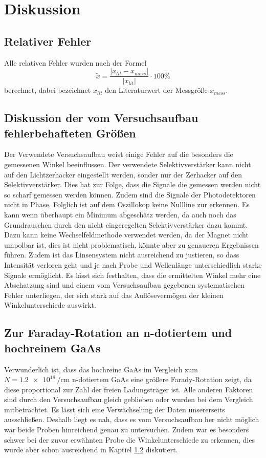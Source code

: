 \section{Diskussion}
\label{sec:Diskussion}
\subsection{Relativer Fehler}
Alle relativen Fehler wurden nach der Formel
\begin{equation*}
  \tilde{x} = \frac{ \lvert x_{lit} - x_{mess} \rvert}{\lvert x_{lit} \rvert}
  \cdot 100 \%
\end{equation*}
berechnet, dabei bezeichnet $x_{lit}$ den Literaturwert der Messgröße $x_{mess}$.

\subsection{Diskussion der vom Versuchsaufbau fehlerbehafteten Größen}
\label{sec:Fehler}
Der Verwendete Versuchsaufbau weist einige Fehler auf die besonders die gemessenen Winkel 
beeinflussen. Der verwendete Selektivverstärker kann nicht auf den Lichtzerhacker eingestellt 
werden, sonder nur der Zerhacker auf den Selektivverstärker. Dies hat zur Folge, dass die Signale 
die gemessen werden nicht so scharf gemessen werden können. Zudem sind die Signale der 
Photodetektoren nicht in Phase. Folglich ist auf dem Oszillokop keine Nullline zur erkennen. Es kann 
wenn überhaupt ein Minimum abgeschätz werden, da auch noch das Grundrauschen durch den nicht 
eingeregelten Selektivverstärker dazu kommt. Dazu kann keine Wechselfeldmethode verwendet werden, da 
der Magnet nicht umpolbar ist, dies ist nicht problematisch, könnte aber zu genaueren Ergebnissen 
führen. Zudem ist das Linsensystem nicht ausreichend zu justieren, so dass Intensität verloren geht 
und je nach Probe und Wellenlänge unterschiedlich starke Signale ermöglicht. 
Es lässt sich festhalten, dass die ermittelten Winkel mehr eine Abschatzung sind und einem vom 
Versuchsaufbau gegebenen systematischen Fehler unterliegen, der sich stark auf das Auflösevermögen 
der kleinen Winkelunterschiede auswirkt.

\subsection{Zur Faraday-Rotation an n-dotiertem und hochreinem GaAs}
Verwunderlich ist, dass das hochreine GaAs im Vergleich zum $N= \SI{1.2e18}{\per\centi\meter}$ 
n-dotiertem GaAs eine größere Farady-Rotation zeigt, da diese 
proportional zur Zahl der freien Ladungsträger ist. Alle anderen Faktoren sind durch den 
Versuchsaufbau gleich geblieben oder wurden bei dem Vergleich mitbetrachtet. Es lässt sich eine 
Verwächselung der Daten unsererseits ausschließen. Deshalb liegt es nah, dass es vom Versuchsaufbau 
her nicht möglich war beide Proben hinreichend genau zu untersuchen. Zudem war es besonders schwer 
bei der zuvor erwähnten Probe die Winkelunterschiede zu erkennen, dies wurde aber schon ausreichend in Kaptiel \ref{sec:Fehler} diskutiert.

